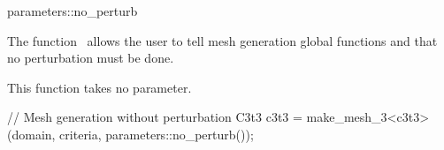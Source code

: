 \ccRefPageBegin


\begin{ccRefFunction}{parameters::no_perturb}  %


\ccDefinition
  
The function \ccRefName\ allows the user to tell mesh generation global functions
 and  that no perturbation must be done.



\ccParameters

This function takes no parameter.



\ccExample

\begin{ccExampleCode}
// Mesh generation without perturbation
C3t3 c3t3 = make_mesh_3<c3t3>(domain, criteria, parameters::no_perturb());
\end{ccExampleCode}

\ccSeeAlso

 \\
 \\
 \\


\end{ccRefFunction}

\ccRefPageEnd

